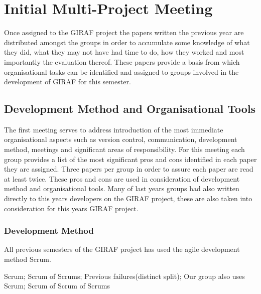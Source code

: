 \section{Initial Multi-Project Meeting}
Once assigned to the GIRAF project the papers written the previous year are distributed amongst the groups in order to accumulate some knowledge of what they did, what they may not have had time to do, how they worked and most importantly the evaluation thereof.
These papers provide a basis from which organisational tasks can be identified and assigned to groups involved in the development of GIRAF for this semester.

\subsection{Development Method and Organisational Tools}
The first meeting serves to address introduction of the most immediate organisational aspects such as version control, communication, development method, meetings and significant areas of responsibility.
For this meeting each group provides a list of the most significant pros and cons identified in each paper they are assigned.
Three papers per group in order to assure each paper are read at least twice.
These pros and cons are used in consideration of development method and organisational tools.
Many of last years groups had also written directly to this years	 developers on the GIRAF project, these are also taken into consideration for this years GIRAF project. 

\subsubsection*{Development Method}
All previous semesters of the GIRAF project has used the agile development method Scrum.

Scrum; Scrum of Scrums; Previous failures(distinct split); Our group also uses Scrum; Scrum of Scrum of Scrums

